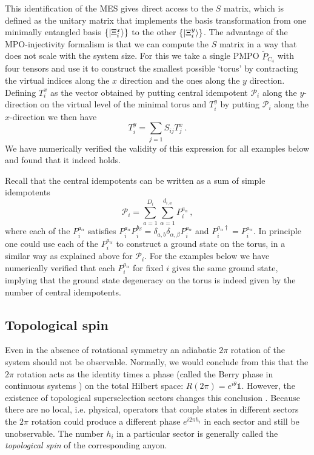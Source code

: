 \documentclass[12 pt]{article}
\begin{document}
This identification of the MES gives direct access to the $S$ matrix, which is defined as the unitary matrix that implements the basis transformation from one minimally entangled basis $\{\ket{\Xi^x_i} \}$ to the other $\{\ket{\Xi^y_i} \}$. The advantage of the MPO-injectivity formalism is that we can compute the $S$ matrix in a way that does not scale with the system size. For this we take a single PMPO $\tilde{P}_{C_4}$ with four tensors and use it to construct the smallest possible `torus' by contracting the virtual indices along the $x$ direction and the ones along the $y$ direction. Defining $T_i^x$ as the vector obtained by putting central idempotent $\mathcal{P}_i$ along the $y$-direction on the virtual level of the minimal torus and $T_i^y$ by putting $\mathcal{P}_i$ along the $x$-direction we then have
\begin{equation}
    T_i^y = \sum_{j = 1} S_{ij} T_j^x\, .
\end{equation}
We have numerically verified the validity of this expression for all examples below and found that it indeed holds.

Recall that the central idempotents can be written as a sum of simple idempotents
\begin{equation}
    \mathcal{P}_i = \sum_{a=1}^{D_i}\sum_{\alpha = 1}^{d_{i,a}} P^{a_\alpha}_i\, ,
\end{equation}
where each of the $P^{a_\alpha}_i$ satisfies $P^{a_\alpha}_iP^{b_\beta}_i = \delta_{a,b}\delta_{\alpha,\beta}P^{a_\alpha}_i$ and $P^{a_\alpha \dagger}_i = P_i^{a_\alpha}$. In principle one could use each of the $P^{a_\alpha}_i$ to construct a ground state on the torus, in a similar way as explained above for $\mathcal{P}_i$. For the examples below we have numerically verified that each $P^{a_\alpha}_i$ for fixed $i$ gives the same ground state, implying that the ground state degeneracy on the torus is indeed given by the number of central idempotents.

\subsection{Topological spin}\label{sec:topspin}

Even in the absence of rotational symmetry an adiabatic $2\pi$ rotation of the system should not be observable. Normally, we would conclude from this that the $2\pi$ rotation acts as the identity times a phase (called the Berry phase in continuous systems \cite{Berry}) on the total Hilbert space: $R(2\pi) = e^{i\theta}\mathds{1}$. However, the existence of topological superselection sectors changes this conclusion \cite{WickWightmanWigner}. Because there are no local, i.e. physical, operators that couple states in different sectors the $2\pi$ rotation could produce a different phase $e^{i2\pi h_i}$ in each sector and still be unobservable. The number $h_i$ in a particular sector is generally called the \emph{topological spin} of the corresponding anyon.
\end{document}
